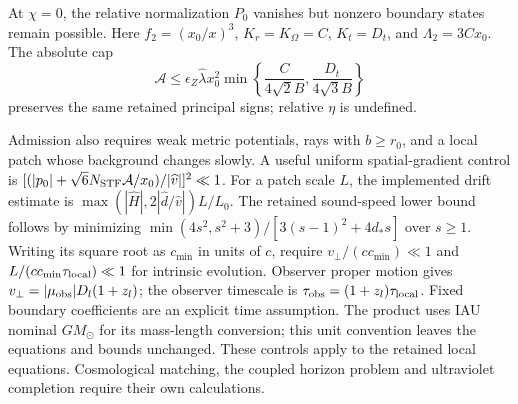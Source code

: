 At $\chi=0$, the relative normalization $P_0$ vanishes but nonzero
boundary states remain possible. Here $f_2=(x_0/x)^3$,
$K_r=K_\Omega=C$, $K_t=D_t$, and $\Lambda_2=3Cx_0$. The absolute cap
\begin{equation}
 \mathcal A\le\epsilon_Z\widehat\lambda x_0^2
 \min\left\{\frac{C}{4\sqrt2B},\frac{D_t}{4\sqrt3B}\right\}
 \label{eq:admission-zero-flux}
\end{equation}
preserves the same retained principal signs; relative $\eta$ is undefined.

Admission also requires weak metric potentials, rays with $b\ge r_0$,
and a local patch whose background changes slowly. A useful uniform
spatial-gradient control is
$[(|p_0|+\sqrt6N_{\rm STF}\mathcal A/x_0)/|\widehat v|]^2\ll1$.
For a patch scale $L$, the implemented drift estimate is
$\max(|\widehat H|,2|\widehat d/\widehat v|)L/L_0$.
The retained sound-speed lower bound follows by minimizing
$\min(4s^2,s^2+3)/[3(s-1)^2+4d_*s]$ over $s\ge1$.
Writing its square root as $c_{\min}$ in units of $c$, require
$v_\perp/(cc_{\min})\ll1$ and
$L/(cc_{\min}\tau_{\rm local})\ll1$ for intrinsic evolution.
Observer proper motion gives $v_\perp=|\mu_{\rm obs}|D_l(1+z_l)$;
the observer timescale is $\tau_{\rm obs}=(1+z_l)\tau_{\rm local}$.
Fixed boundary coefficients are an explicit time assumption.
The product uses IAU nominal $GM_\odot$ for its mass-length conversion;
this unit convention leaves the equations and bounds unchanged.
These controls apply to the retained local equations. Cosmological
matching, the coupled horizon problem and ultraviolet completion require
their own calculations.
